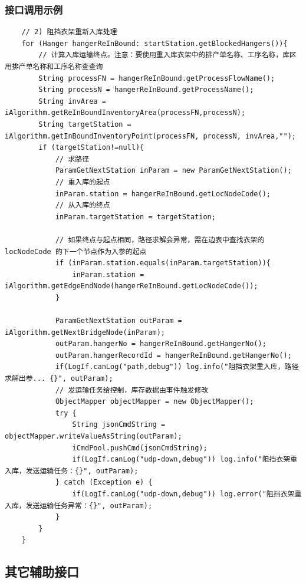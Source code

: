 \subsubsection{接口调用示例}
\begin{lstlisting}
    // 2) 阻挡衣架重新入库处理
    for (Hanger hangerReInBound: startStation.getBlockedHangers()){
        // 计算入库运输终点。注意：要使用重入库衣架中的排产单名称、工序名称，库区用排产单名称和工序名称查查询
        String processFN = hangerReInBound.getProcessFlowName();
        String processN = hangerReInBound.getProcessName();
        String invArea = iAlgorithm.getReInBoundInventoryArea(processFN,processN);
        String targetStation = iAlgorithm.getInBoundInventoryPoint(processFN, processN, invArea,"");
        if (targetStation!=null){
            // 求路径
            ParamGetNextStation inParam = new ParamGetNextStation();
            // 重入库的起点
            inParam.station = hangerReInBound.getLocNodeCode();
            // 从入库的终点
            inParam.targetStation = targetStation;

            // 如果终点与起点相同，路径求解会异常，需在边表中查找衣架的 locNodeCode 的下一个节点作为入参的起点
            if (inParam.station.equals(inParam.targetStation)){
                inParam.station = iAlgorithm.getEdgeEndNode(hangerReInBound.getLocNodeCode());
            }

            ParamGetNextStation outParam = iAlgorithm.getNextBridgeNode(inParam);
            outParam.hangerNo = hangerReInBound.getHangerNo();
            outParam.hangerRecordId = hangerReInBound.getHangerNo();
            if(LogIf.canLog("path,debug")) log.info("阻挡衣架重入库，路径求解出参... {}", outParam);
            // 发运输任务给控制，库存数据由事件触发修改
            ObjectMapper objectMapper = new ObjectMapper();
            try {
                String jsonCmdString = objectMapper.writeValueAsString(outParam);
                iCmdPool.pushCmd(jsonCmdString);
                if(LogIf.canLog("udp-down,debug")) log.info("阻挡衣架重入库，发送运输任务：{}", outParam);
            } catch (Exception e) {
                if(LogIf.canLog("udp-down,debug")) log.error("阻挡衣架重入库，发送运输任务异常：{}", outParam);
            }
        }
    }
\end{lstlisting}\vspace{-30pt}

\subsection{其它辅助接口}
